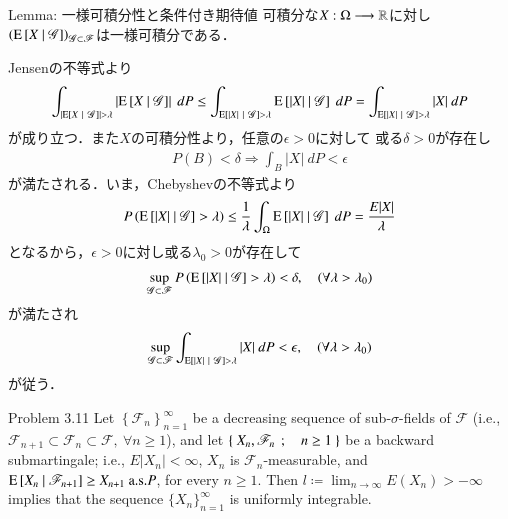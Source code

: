 	\begin{itembox}[l]{Lemma: 一様可積分性と条件付き期待値}\label{lem:uniformly_integrability_and_conditional_expectations}
		可積分な$X:\Omega \longrightarrow \mathbb{R}$に対し$\left( \operatorname{E} \left[ X \ \middle|\ \mathscr{G} \right] \right)_{\mathscr{G} \subset \mathscr{F}}$は一様可積分である．
	\end{itembox}
	
	\begin{prf}
		Jensenの不等式より
				\begin{align}
					\int_{\left| \cexp{X}{\mathscr{G}} \right| > \lambda} \left| \cexp{X}{\mathscr{G}} \right|\ dP
					\leq \int_{\cexp{|X|}{\mathscr{G}} > \lambda} \cexp{|X|}{\mathscr{G}}\ dP
					= \int_{\cexp{|X|}{\mathscr{G}} > \lambda} |X|\ dP
				\end{align}
				が成り立つ．また$X$の可積分性より，任意の$\epsilon > 0$に対して
				或る$\delta > 0$が存在し
				\begin{align}
					P(B) < \delta \Rightarrow \int_B |X|\ dP < \epsilon
				\end{align}
				が満たされる．いま，Chebyshevの不等式より
				\begin{align}
					P\left( \operatorname{E} \left[ |X| \ \middle|\ \mathscr{G} \right] > \lambda \right)
					\leq \frac{1}{\lambda} \int_\Omega \operatorname{E} \left[ |X| \ \middle|\ \mathscr{G} \right]\ dP
					= \frac{E|X|}{\lambda}
				\end{align}
				となるから，$\epsilon > 0$に対し或る$\lambda_0 > 0$が存在して
				\begin{align}
					\operatorname*{sup}_{\mathscr{G} \subset \mathscr{F}} P\left( \operatorname{E} \left[ |X| \ \middle|\ \mathscr{G} \right] > \lambda \right)
					< \delta,
					\quad (\forall \lambda > \lambda_0)
				\end{align}
				が満たされ
				\begin{align}
					\operatorname*{sup}_{\mathscr{G} \subset \mathscr{F}} \int_{\operatorname{E} \left[ |X| \ \middle|\ \mathscr{G} \right] > \lambda}|X|\ dP
					< \epsilon,
					\quad (\forall \lambda > \lambda_0)
				\end{align}
				が従う．
		\QED
	\end{prf}
	
	\begin{itembox}[l]{Problem 3.11}
		Let $\left\{ \mathscr{F}_n \right\}_{n=1}^\infty$ be a decreasing sequence of sub-$\sigma$-fields of 
		$\mathscr{F}$ (i.e.,$\mathscr{F}_{n+1} \subset \mathscr{F}_n \subset \mathscr{F},\ \forall n \geq 1$),
		and let $\left\{\ X_n,\mathscr{F}_n\ \, ; \quad n \geq 1\ \right\}$ be a backward submartingale; i.e., $E|X_n| < \infty$, $X_n$
		is $\mathscr{F}_n$-measurable, and $\operatorname{E} \left[ X_n \ \middle|\ \mathscr{F}_{n+1} \right] \geq X_{n+1}\ \mbox{a.s.$P$}$, for
		every $n \geq 1$. Then $l \coloneqq \lim_{n \to \infty} E(X_n) > -\infty$ implies that the sequence $\{X_n\}_{n=1}^\infty$
		is uniformly integrable.
	\end{itembox}
	
